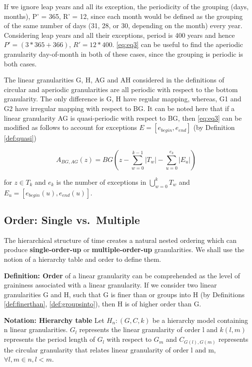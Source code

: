 \documentclass[12pt]{article}
\begin{document}
If we ignore leap years and all its exception, the periodicity of the
grouping (days, months), P' = 365, R' = 12, since each month would be
defined as the grouping of the same number of days (31, 28, or 30,
depending on the month) every year. Considering leap years and all their
exceptions, period is 400 years and hence \(P' = (3*365 + 366)\),
\(R' = 12*400\). \autoref{eq:eq3} can be useful to find the aperiodic
granularity day-of-month in both of these cases, since the grouping is
periodic is both cases.

The linear granularities G, H, AG and AH considered in the definitions
of circular and aperiodic granularities are all periodic with respect to
the bottom granularity. The only difference is G, H have regular
mapping, whereas, G1 and G2 have irregular mapping with respect to BG.
It can be noted here that if a linear granularity AG is quasi-periodic
with respect to BG, then \autoref{eq:eq3} can be modified as follows to
account for exceptions \(E = [e_{begin}, e_{end}]\) (by Definition
\autoref{def:quasi})

\begin{equation}\label{eq6}
A_{BG, AG}(z) = BG(z - \sum_{w=0}^{k-1}\vert T_{w} \vert - \sum_{u=0}^{e_k}\vert E_{u} \vert)
\end{equation}

for \(z \in T_k\) and \(e_k\) is the number of exceptions in
\(\bigcup\limits_{w = 0}^{k} T_w\) and
\(E_{u} = [e_{begin}(u), e_{end}(u)]\).

\hypertarget{sec:order}{%
\subsection{Order: Single vs.~Multiple}\label{sec:order}}

The hierarchical structure of time creates a natural nested ordering
which can produce \textbf{single-order-up} or \textbf{multiple-order-up}
granularities. We shall use the notion of a hierarchy table and order to
define them.

\textbf{Definition: Order} of a linear granularity can be comprehended
as the level of graininess associated with a linear granularity. If we
consider two linear granularities G and H, such that G is finer than or
groups into H (by Definitions \ref{def:finerthan},
\ref{def:groupsinto}), then H is of higher order than G.

\textbf{Notation: Hierarchy table} Let \(H_n: (G, C, k)\) be a hierarchy
model containing n linear granularities. \(G_{l}\) represents the linear
granularity of order l and \(k(l,m)\) represents the period length of
\(G_{l}\) with respect to \(G_{m}\) and \(C_{G(l),G(m)}\) represents the
circular granularity that relates linear granularity of order l and m,
\(\forall l,m \in n, l<m\).
\end{document}
